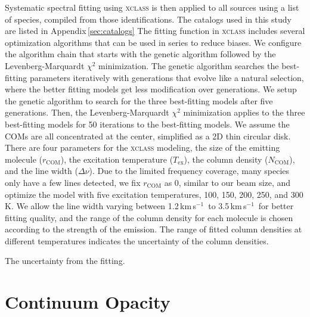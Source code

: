 \documentclass[twocolumn]{aastex62}
\newcommand{\kms}{\mbox{\,km\,s$^{-1}$}}
\begin{document}
Systematic spectral fitting using \textsc{xclass} is then applied to all sources using a list of species, compiled from those identifications.  The catalogs used in this study are listed in Appendix\,\ref{sec:catalogs}  The fitting function in \textsc{xclass} includes several optimization algorithms that can be used in series to reduce biases.  We configure the algorithm chain that starts with the genetic algorithm followed by the Levenberg-Marquardt $\chi^{2}$ minimization.  The genetic algorithm searches the best-fitting parameters iteratively with generations that evolve like a natural selection, where the better fitting models get less modification over generations.  We setup the genetic algorithm to search for the three best-fitting models after five generations.  Then, the Levenberg-Marquardt $\chi^{2}$ minimization applies to the three best-fitting models for 50 iterations to the best-fitting models.  We assume the COMs are all concentrated at the center, simplified as a 2D thin circular disk.  There are four parameters for the \textsc{xclass} modeling, the size of the emitting molecule ($r_\text{COM}$), the excitation temperature ($T_\text{ex}$), the column density ($N_\text{COM}$), and the line width ($\Delta \nu$).  Due to the limited frequency coverage, many species only have a few lines detected, we fix $r_\text{COM}$ as 0, similar to our beam size, and optimize the model with five excitation temperatures, 100, 150, 200, 250, and 300 K.  We allow the line width varying between 1.2\kms\ to 3.5\kms\ for better fitting quality, and the range of the column density for each molecule is chosen according to the strength of the emission.  The range of fitted column densities at different temperatures indicates the uncertainty of the column densities.

The uncertainty from the fitting.

\newpage


\section{Continuum Opacity}
\end{document}
